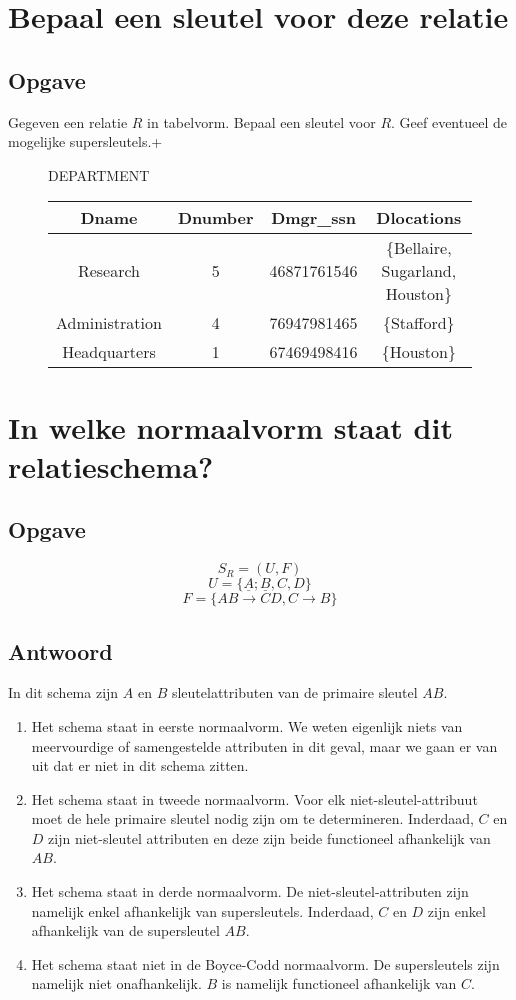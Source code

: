\documentclass[normaalvormen.tex]{subfiles}
\begin{document}
\section{Bepaal een sleutel voor deze relatie}
\subsection*{Opgave}
Gegeven een relatie $R$ in tabelvorm. Bepaal een sleutel voor $R$.
Geef eventueel de mogelijke supersleutels.+
\begin{figure}
\centering
DEPARTMENT\\
\begin{tabular}{c|c|c|c}
Dname & Dnumber & Dmgr\_ssn & Dlocations\\\hline
Research &5 & 46871761546 & \{Bellaire, Sugarland, Houston\}\\
Administration & 4& 76947981465 & \{Stafford\}\\
Headquarters & 1 & 67469498416 & \{Houston\}
\end{tabular}
\end{figure}

\section{In welke normaalvorm staat dit relatieschema?}
\subsection*{Opgave}
\[
S_{R} = (U,F)
\]
\[
U = \{\underline{A};\underline{B},C,D\}
\]
\[
F = \{AB\rightarrow CD, C \rightarrow B\}
\]

\subsection*{Antwoord}
In dit schema zijn $A$ en $B$ sleutelattributen van de primaire sleutel $AB$.
\begin{enumerate}
\item Het schema staat in eerste normaalvorm. We weten eigenlijk niets van meervourdige of samengestelde attributen in dit geval, maar we gaan er van uit dat er niet in dit schema zitten.

\item Het schema staat in tweede normaalvorm. Voor elk niet-sleutel-attribuut moet de hele primaire sleutel nodig zijn om te determineren. Inderdaad, $C$ en $D$ zijn niet-sleutel attributen en deze zijn beide functioneel afhankelijk van $AB$.

\item Het schema staat in derde normaalvorm. De niet-sleutel-attributen zijn namelijk enkel afhankelijk van supersleutels. Inderdaad, $C$ en $D$ zijn enkel afhankelijk van de supersleutel $AB$.

\item Het schema staat niet in de Boyce-Codd normaalvorm. De supersleutels zijn namelijk niet onafhankelijk. $B$ is namelijk functioneel afhankelijk van $C$.
\end{enumerate}
\end{document}
